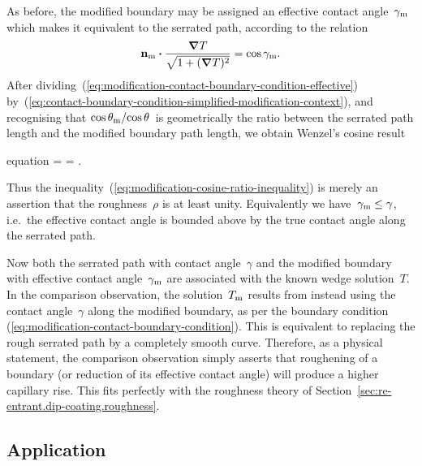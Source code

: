 As before, the modified boundary may be assigned
an effective contact angle~$\gamma_{\mathrm{m}}$
which makes it equivalent to the serrated path,
according to the relation
\begin{equation}
  \mathop{}\!\boldsymbol{\mathbf{n}}_{\mathrm{m}} \boldsymbol{\cdot} \frac{\mathop{}\!\boldsymbol{\mathbf{\nabla}} T}{\sqrt{1 + (\mathop{}\!\boldsymbol{\mathbf{\nabla}} T)^2}}
    = \cos\gamma_{\mathrm{m}}.
  \label{eq:modification-contact-boundary-condition-effective}
\end{equation}
After dividing~(\ref{eq:modification-contact-boundary-condition-effective})
by~(\ref{eq:contact-boundary-condition-simplified-modification-context}),
and recognising that $\cos\theta_{\mathrm{m}} / {\cos\theta}$~is geometrically
the ratio between the serrated path length
and the modified boundary path length,
we obtain Wenzel's cosine result
\begin{important}{equation}
  \rho
    = \frac{\cos\theta_\modi}{\cos\theta}
    = \frac{\cos\gamma_\modi}{\cos\gamma}.
  \label{eq:modification-roughness-cosine-ratio}
\end{important}
Thus the inequality~(\ref{eq:modification-cosine-ratio-inequality})
is merely an assertion that the roughness~$\rho$ is at least unity.
Equivalently we have~$\gamma_{\mathrm{m}} \le \gamma$,
i.e.~the effective contact angle is bounded above
by the true contact angle along the serrated path.

Now both the serrated path with contact angle~$\gamma$
and the modified boundary with effective contact angle~$\gamma_{\mathrm{m}}$
are associated with the known wedge solution~$T$.
In the comparison observation,
the solution~$T_{\mathrm{m}}$ results from instead using the contact angle~$\gamma$
along the modified boundary,
as per the boundary condition~%
  (\ref{eq:modification-contact-boundary-condition}).
This is equivalent to replacing the rough serrated path
by a completely smooth curve.
Therefore, as a physical statement,
the comparison observation simply asserts that
roughening of a boundary (or reduction of its effective contact angle)
will produce a higher capillary rise.
This fits perfectly with the roughness theory
of Section~\ref{sec:re-entrant.dip-coating.roughness}.

\subsection{Application}
\label{sec:small.modification.application}

